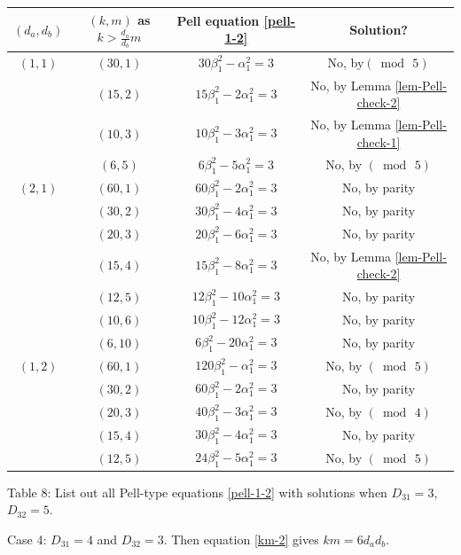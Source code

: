 \documentclass[12pt]{article}
\begin{document}
\begin{center}
\begin{tabular}{|c|c|c|c|}
\hline $(d_a, d_b)$ & $(k, m)$ as $k > \frac{d_a}{d_b} m$ & Pell equation \eqref{pell-1-2} & Solution? \\
\hline $(1,1)$ & $(30,1)$ & $30\beta_1^2-\alpha_1^2=3$ & No, by$(\bmod \, 5)$\\
\hline & $(15,2)$ & $15\beta_1^2-2\alpha_1^2=3$ & No, by Lemma \ref{lem-Pell-check-2}\\
\hline & $(10,3)$ & $10\beta_1^2-3\alpha_1^2=3$ & No, by Lemma \ref{lem-Pell-check-1}\\
\hline & $(6,5)$ & $6\beta_1^2-5\alpha_1^2=3$ & No, by $(\bmod \, 5)$\\
\hline $(2,1)$ & $(60,1)$ & $60\beta_1^2-2\alpha_1^2=3$ & No, by parity\\
\hline & $(30,2)$ & $30\beta_1^2-4\alpha_1^2=3$ & No, by parity\\
\hline & $(20,3)$ & $20\beta_1^2-6\alpha_1^2=3$ & No, by parity\\
\hline & $(15,4)$ & $15\beta_1^2-8\alpha_1^2=3$ & No, by Lemma \ref{lem-Pell-check-2}\\
\hline & $(12,5)$ & $12\beta_1^2-10\alpha_1^2=3$ & No, by parity\\
\hline & $(10,6)$ & $10\beta_1^2-12\alpha_1^2=3$ & No, by parity\\
\hline & $(6,10)$ & $6\beta_1^2-20\alpha_1^2=3$ & No, by parity\\
\hline $(1,2)$ & $(60,1)$ & $120\beta_1^2-\alpha_1^2=3$ & No, by $(\bmod \, 5)$\\
\hline & $(30,2)$ & $60\beta_1^2-2\alpha_1^2=3$ & No, by parity\\
\hline & $(20,3)$ & $40\beta_1^2-3\alpha_1^2=3$ & No, by $(\bmod \, 4)$\\
\hline & $(15,4)$ & $30\beta_1^2-4\alpha_1^2=3$ & No, by parity\\
\hline & $(12,5)$ & $24\beta_1^2-5\alpha_1^2=3$ & No, by $(\bmod \, 5)$\\
\hline
\end{tabular}
\newline \small{Table 8: List out all Pell-type equations \eqref{pell-1-2} with solutions when $D_{31} = 3$, $D_{32} = 5$.}
\end{center}

Case 4: $D_{31} = 4$ and $D_{32} = 3$. Then equation \eqref{km-2} gives $k m = 6 d_a d_b$. 
\end{document}
